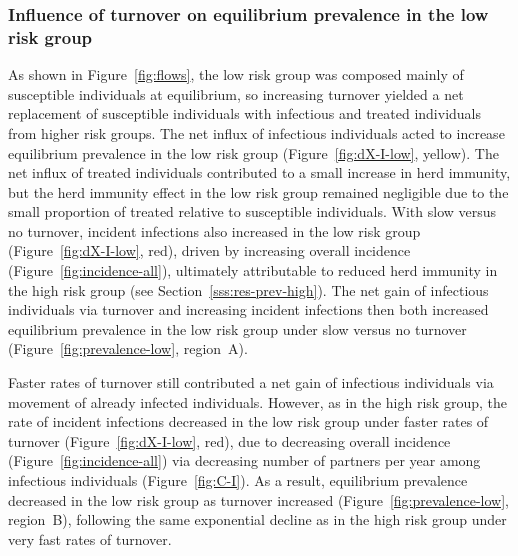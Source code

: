 \subsubsection{Influence of turnover on equilibrium prevalence in the low risk group}
\label{sss:res-prev-low}
As shown in Figure~\ref{fig:flows}, the low risk group was
composed mainly of susceptible individuals at equilibrium,
so increasing turnover yielded
a net replacement of susceptible individuals
with infectious and treated individuals from higher risk groups.
The net influx of infectious individuals acted to
increase equilibrium prevalence in the low risk group
(Figure~\ref{fig:dX-I-low}, yellow).
The net influx of treated individuals
contributed to a small increase in herd immunity,
but the herd immunity effect in the low risk group
remained negligible due to
the small proportion of treated relative to susceptible individuals.
With slow versus no turnover,
incident infections also increased in the low risk group
(Figure~\ref{fig:dX-I-low}, red),
driven by increasing overall incidence
(Figure~\ref{fig:incidence-all}),
ultimately attributable to reduced herd immunity in the high risk group
(see Section~\ref{sss:res-prev-high}).
The net gain of infectious individuals via turnover and increasing incident infections
then both increased equilibrium prevalence in the low risk group
under slow versus no turnover
(Figure~\ref{fig:prevalence-low}, region~A).
\par
Faster rates of turnover still contributed a net gain of infectious individuals
via movement of already infected individuals.
However, as in the high risk group,
the rate of incident infections decreased
in the low risk group under faster rates of turnover
(Figure~\ref{fig:dX-I-low}, red),
due to decreasing overall incidence
(Figure~\ref{fig:incidence-all})
via decreasing number of partners per year among infectious individuals
(Figure~\ref{fig:C-I}).
As a result, equilibrium prevalence decreased in the low risk group as turnover increased
(Figure~\ref{fig:prevalence-low}, region~B),
following the same exponential decline as in the high risk group
under very fast rates of turnover.

